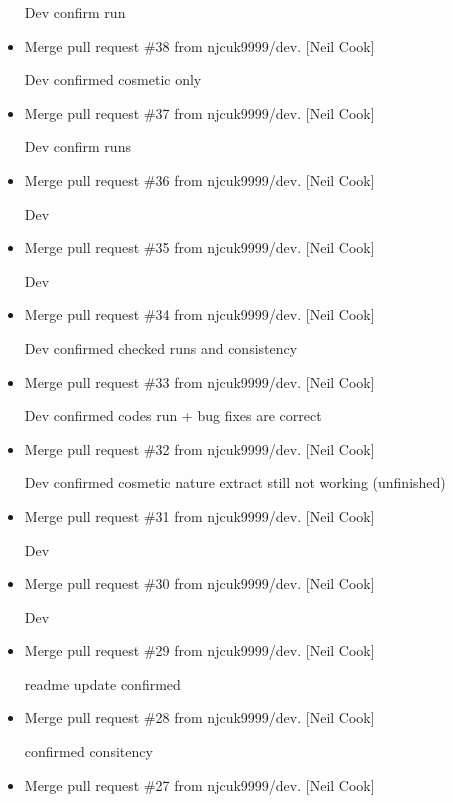 \documentclass[a4paper,10pt,english]{report}
\begin{document}
\begin{itemize}
Dev \sphinxhyphen{} confirm run

\item {} 
Merge pull request \#38 from njcuk9999/dev. {[}Neil Cook{]}

Dev \sphinxhyphen{} confirmed cosmetic only

\item {} 
Merge pull request \#37 from njcuk9999/dev. {[}Neil Cook{]}

Dev \sphinxhyphen{} confirm runs

\item {} 
Merge pull request \#36 from njcuk9999/dev. {[}Neil Cook{]}

Dev

\item {} 
Merge pull request \#35 from njcuk9999/dev. {[}Neil Cook{]}

Dev

\item {} 
Merge pull request \#34 from njcuk9999/dev. {[}Neil Cook{]}

Dev \sphinxhyphen{} confirmed checked runs and consistency

\item {} 
Merge pull request \#33 from njcuk9999/dev. {[}Neil Cook{]}

Dev \sphinxhyphen{} confirmed codes run + bug fixes are correct

\item {} 
Merge pull request \#32 from njcuk9999/dev. {[}Neil Cook{]}

Dev \sphinxhyphen{} confirmed cosmetic nature \sphinxhyphen{} extract still not working (unfinished)

\item {} 
Merge pull request \#31 from njcuk9999/dev. {[}Neil Cook{]}

Dev

\item {} 
Merge pull request \#30 from njcuk9999/dev. {[}Neil Cook{]}

Dev

\item {} 
Merge pull request \#29 from njcuk9999/dev. {[}Neil Cook{]}

readme update \sphinxhyphen{} confirmed

\item {} 
Merge pull request \#28 from njcuk9999/dev. {[}Neil Cook{]}

confirmed consitency

\item {} 
Merge pull request \#27 from njcuk9999/dev. {[}Neil Cook{]}


\end{itemize}
\end{document}
